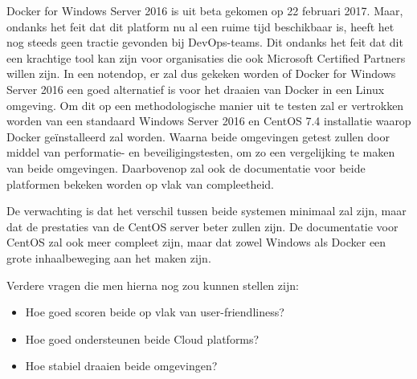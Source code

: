 Docker for Windows Server 2016 is uit beta gekomen op 22 februari 2017. Maar, ondanks het feit dat dit platform nu al een ruime tijd beschikbaar is, heeft het nog steeds geen tractie gevonden bij DevOps-teams. Dit ondanks het feit dat dit een krachtige tool kan zijn voor organisaties die ook Microsoft Certified Partners willen zijn. In een notendop, er zal dus gekeken worden of Docker for Windows Server 2016 een goed alternatief is voor het draaien van Docker in een Linux omgeving. Om dit op een methodologische manier uit te testen zal er vertrokken worden van een standaard Windows Server 2016 en CentOS 7.4 installatie waarop Docker geïnstalleerd zal worden. Waarna beide omgevingen getest zullen door middel van performatie- en beveiligingstesten, om zo een vergelijking te maken van beide omgevingen. Daarbovenop zal ook de documentatie voor beide platformen bekeken worden op vlak van compleetheid.
\par
De verwachting is dat het verschil tussen beide systemen minimaal zal zijn, maar dat de prestaties van de CentOS server beter zullen zijn. De documentatie voor CentOS zal ook meer compleet zijn, maar dat zowel Windows als Docker een grote inhaalbeweging aan het maken zijn.
\par
Verdere vragen die men hierna nog zou kunnen stellen zijn:
\begin{itemize}[noitemsep]
	\item Hoe goed scoren beide op vlak van user-friendliness?
	\item Hoe goed ondersteunen beide Cloud platforms?
	\item Hoe stabiel draaien beide omgevingen?
\end{itemize}